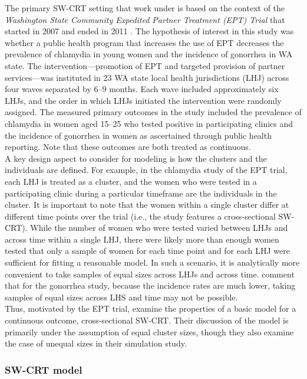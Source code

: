 \documentclass[10pt]{article}
\begin{document}
The primary SW-CRT setting that \citeauthor{Hussey:2007} work under is based on the context of the \textit{Washington State Community Expedited Partner Treatment (EPT) Trial} that started in 2007 and ended in 2011 \parencite{Golden:2015}. The hypothesis of interest in this study was whether a public health program that increases the use of EPT decreases the prevalence of chlamydia in young women and the incidence of gonorrhea in WA state. The intervention---promotion of EPT and targeted provision of partner services---was instituted in 23 WA state local health jurisdictions (LHJ) across four waves separated by 6--9 months. Each wave included approximately six LHJs, and the order in which LHJs initiated the intervention were randomly assigned. The measured primary outcomes in the study included the prevalence of chlamydia in women aged 15--25 who tested positive in participating clinics and the incidence of gonorrhea in women as ascertained through public health reporting. Note that these outcomes are both treated as continuous.
\\

A key design aspect to consider for modeling is how the clusters and the individuals are defined. For example, in the chlamydia study of the EPT trial, each LHJ is treated as a cluster, and the women who were tested in a participating clinic during a particular timeframe are the individuals in the cluster. It is important to note that the women within a single cluster differ at different time points over the trial (i.e., the study features a cross-sectional SW-CRT). While the number of women who were tested varied between LHJs and across time within a single LHJ, there were likely more than enough women tested that only a sample of women for each time point and for each LHJ were sufficient for fitting a reasonable model. In such a scenario, it is analytically more convenient to take samples of equal sizes across LHJs and across time. \textcite{Hussey:2007} comment that for the gonorrhea study, because the incidence rates are much lower, taking samples of equal sizes across LHS and time may not be possible.
\\

Thus, motivated by the EPT trial, \citeauthor{Hussey:2007} examine the properties of a basic model for a continuous outcome, cross-sectional SW-CRT. Their discussion of the model is primarily under the assumption of equal cluster sizes, though they also examine the case of unequal sizes in their simulation study.

\subsubsection{SW-CRT model} \label{sec:model}
\end{document}
